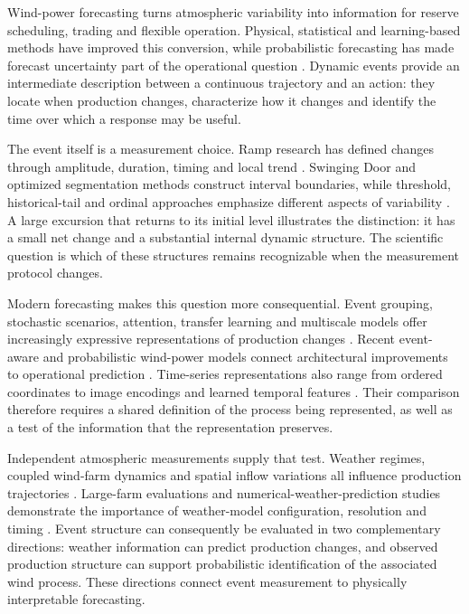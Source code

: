 \documentclass[preprint,12pt]{elsarticle}
\begin{document}
Wind-power forecasting turns atmospheric variability into information for reserve scheduling, trading and flexible operation. Physical, statistical and learning-based methods have improved this conversion, while probabilistic forecasting has made forecast uncertainty part of the operational question \citep{foley2012, pinson2013, hong2016}. Dynamic events provide an intermediate description between a continuous trajectory and an action: they locate when production changes, characterize how it changes and identify the time over which a response may be useful.

The event itself is a measurement choice. Ramp research has defined changes through amplitude, duration, timing and local trend \citep{gallego2015, zhang2025rampreview}. Swinging Door and optimized segmentation methods construct interval boundaries, while threshold, historical-tail and ordinal approaches emphasize different aspects of variability \citep{florita2013, cui2015, ramp_piecewise2023, var2024, ordinal2023}. A large excursion that returns to its initial level illustrates the distinction: it has a small net change and a substantial internal dynamic structure. The scientific question is which of these structures remains recognizable when the measurement protocol changes.

Modern forecasting makes this question more consequential. Event grouping, stochastic scenarios, attention, transfer learning and multiscale models offer increasingly expressive representations of production changes \citep{trend2023, cui2015stochastic, multitask2024, rampattention2024, temporal2024, transfer2023}. Recent event-aware and probabilistic wind-power models connect architectural improvements to operational prediction \citep{apenergy124068, apenergy123487}. Time-series representations also range from ordered coordinates to image encodings and learned temporal features \citep{fawaz2019, wang2015gaf, wu2023timesnet, zhou2025kanad}. Their comparison therefore requires a shared definition of the process being represented, as well as a test of the information that the representation preserves.

Independent atmospheric measurements supply that test. Weather regimes, coupled wind-farm dynamics and spatial inflow variations all influence production trajectories \citep{regimes2015, coupled2024, apenergy125135}. Large-farm evaluations and numerical-weather-prediction studies demonstrate the importance of weather-model configuration, resolution and timing \citep{jin2024, bianco2025, nwpattention2023}. Event structure can consequently be evaluated in two complementary directions: weather information can predict production changes, and observed production structure can support probabilistic identification of the associated wind process. These directions connect event measurement to physically interpretable forecasting.
\end{document}
